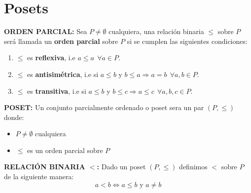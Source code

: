 \section{Posets}
  \PN \textbf{ORDEN PARCIAL:} Sea $P \neq \emptyset$ cualquiera, una relación binaria $\leq$ sobre $ P$ será llamada un
  \textbf{orden parcial} sobre $P$ si se cumplen las siguientes condiciones:
  \begin{enumerate}
    \item $\leq$ es \textbf{reflexiva}, i.e $a \leq a \ \ \forall a \in P$.
    \item $\leq$ es \textbf{antisimétrica}, i.e si $a \leq b$ y $b \leq a \Rightarrow a=b \ \ \forall a, b \in P$.
    \item $\leq$ es \textbf{transitiva}, i.e si $a \leq b$ y $b \leq c \Rightarrow a \leq c \ \ \forall a, b, c \in P$.
  \end{enumerate}

  \PN \textbf{POSET:} Un conjunto parcialmente ordenado o poset sera un par $(P,\leq)$ donde:
  \begin{itemize}
    \item $P \neq \emptyset$ cualquiera
    \item $\leq$ es un orden parcial sobre $P$
  \end{itemize}

  \PN \textbf{RELACIÓN BINARIA $<$:} Dado un poset $(P,\leq)$ definimos $<$ sobre $P$ de la siguiente manera:
  \[
    a < b \Leftrightarrow a \leq b \text{ y } a \neq b
  \]

